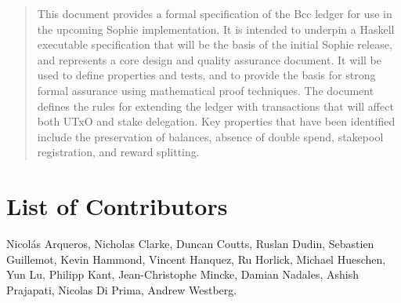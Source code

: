 \begin{abstract}
This document provides a formal specification of the Bcc ledger for use in the upcoming Sophie implementation.
It is intended to underpin a Haskell executable specification that will be the basis of the initial
Sophie release, and represents a core design and quality assurance document.
It will be used to define properties and tests, and to provide the basis for strong formal assurance
using mathematical proof techniques.
The document defines the rules for extending the ledger with transactions
that will affect both UTxO and stake delegation.
Key properties that have been identified include the preservation of balances, absence of double spend, stakepool registration,
and reward splitting.
\end{abstract}

\section*{List of Contributors}
\label{acknowledgements}

Nicol\'as Arqueros,
Nicholas Clarke,
Duncan Coutts,
Ruslan Dudin,
Sebastien Guillemot,
Kevin Hammond,
Vincent Hanquez,
Ru Horlick,
Michael Hueschen,
Yun Lu,
Philipp Kant,
Jean-Christophe Mincke,
Damian Nadales,
Ashish Prajapati,
Nicolas Di Prima,
Andrew Westberg.
